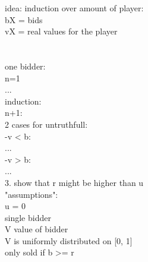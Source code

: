 \documentclass{article}
\begin{document}





idea: induction over amount of player:\\
bX = bids\\
vX = real values for the player\\
\\\\
one bidder:\\
n=1\\
...\\
induction:\\
n+1:\\
2 cases for untruthfull:\\
-v < b: \\
...\\
-v > b: \\
...\\






3. show that r might be higher than u\\
"assumptions":\\
u = 0\\
single bidder\\
V value of bidder\\
V is uniformly distributed on [0, 1]\\
only sold if b >= r\\
\\\\

\end{document}
